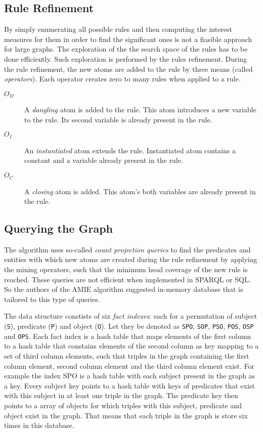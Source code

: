 \subsection{Rule Refinement}

By simply enumerating all possible rules and then computing the interest measures for them in order to find the significant ones is not a fiasible approach for large graphs. The exploration of the the search space of the rules has to be done efficiently. Such exploration is performed by the rules refinement. During the rule refinement, the new atoms are added to the rule by three means (called \textit{operators}). Each operator creates zero to many rules when applied to a rule.

\begin{description}
    \item[$O_{D}$] A \textit{dangling} atom is added to the rule. This atom introduces a new variable to the rule. Its second variable is already present in the rule.
    \item[$O_{I}$] An \textit{instantiated} atom extends the rule. Instantiated atom contains a constant and a variable already present in the rule.
    \item[$O_{C}$] A \textit{closing} atom is added. This atom's both variables are already present in the rule.
\end{description}

\subsection{Querying the Graph}

The algorithm uses so-called \textit{count projection queries} to find the predicates and entities with which new atoms are created during the rule refinement by applying the mining operators, such that the minimum head coverage of the new rule is reached. These queries are not efficient when implemented in SPARQL or SQL. So the authors of the AMIE algorithm suggested in-memory database that is tailored to this type of queries.

The data structure constists of six \textit{fact indexes}: each for a permutation of subject (\verb|S|), predicate (\verb|P|) and object (\verb|O|). Let they be denoted as \verb|SPO|, \verb|SOP|, \verb|PSO|, \verb|POS|, \verb|OSP| and \verb|OPS|. Each fact index is a hash table that maps elements of the first column to a hash table that constains elements of the second column as key mapping to a set of third column elements, such that triples in the graph containing the first column element, second column element and the third column element exist. For example the index SPO is a hash table with each subject present in the graph as a key. Every subject key points to a hash table with keys of predicates that exist with this subject in at least one triple in the graph. The predicate key then points to a array of objects for which triples with this subject, predicate and object exist in the graph. That means that each triple in the graph is store six times in this database.

